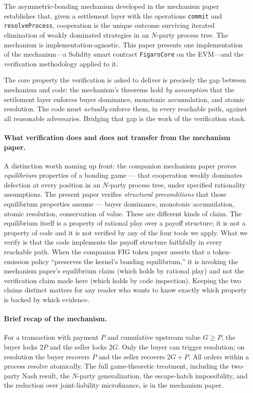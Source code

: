 \documentclass[11pt,a4paper]{article}
\theoremstyle{definition}
\theoremstyle{remark}
\newcommand{\pay}{P}
\newcommand{\cumval}{G}
\begin{document}
The asymmetric-bonding mechanism developed
in the mechanism paper establishes that, given a settlement
layer with the operations \texttt{commit} and \texttt{resolveProcess},
cooperation is the unique outcome surviving iterated elimination of
weakly dominated strategies in an $N$-party process tree. The
mechanism is implementation-agnostic. This paper presents one
implementation of the mechanism---a Solidity smart contract
\texttt{FigaroCore} on the EVM---and the verification methodology
applied to it.

The core property the verification is asked to deliver is precisely
the gap between mechanism and code: the mechanism's theorems hold
\emph{by assumption} that the settlement layer enforces buyer
dominance, monotonic accumulation, and atomic resolution. The code
must \emph{actually} enforce them, in every reachable path, against
all reasonable adversaries. Bridging that gap is the work of the
verification stack.

\paragraph{What verification does and does not transfer from the mechanism paper.}
A distinction worth naming up front: the companion mechanism paper
proves \emph{equilibrium} properties of a bonding game --- that
cooperation weakly dominates defection at every position in an
$N$-party process tree, under specified rationality assumptions.
The present paper verifies \emph{structural preconditions} that
those equilibrium properties assume --- buyer dominance, monotonic
accumulation, atomic resolution, conservation of value. These are
different kinds of claim. The equilibrium itself is a property of
rational play over a payoff structure; it is not a property of
code and it is not verified by any of the four tools we apply.
What we verify is that the code implements the payoff structure
faithfully in every reachable path. When the companion
FIG token paper asserts that a
token-emission policy ``preserves the kernel's bonding
equilibrium,'' it is invoking the mechanism paper's equilibrium
claim (which holds by rational play) and not the verification
claim made here (which holds by code inspection). Keeping the two
claims distinct matters for any reader who wants to know exactly
which property is backed by which evidence.

\paragraph{Brief recap of the mechanism.}
For a transaction with payment $\pay$ and cumulative upstream value
$\cumval \geq \pay$, the buyer locks $2\pay$ and the seller locks
$2\cumval$. Only the buyer can trigger resolution; on resolution the
buyer recovers $\pay$ and the seller recovers $2\cumval + \pay$. All
orders within a process resolve atomically. The full game-theoretic
treatment, including the two-party Nash result, the $N$-party
generalization, the escape-hatch impossibility, and the reduction
over joint-liability microfinance, is in the mechanism paper.
\end{document}
